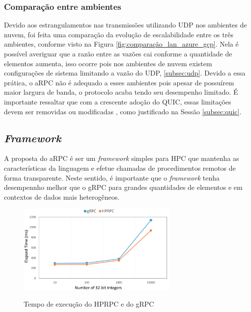 \subsubsection{Comparação entre ambientes}

Devido aos estrangulamentos nas transmissões utilizando UDP nos ambientes de nuvem, foi feita uma comparação da evolução de escalabilidade entre os três ambientes, conforme visto na Figura \ref{fig:comparação_lan_azure_gcp}. Nela é possível averiguar que a razão entre as vazões cai conforme a quantidade de elementos aumenta, isso ocorre pois nos ambientes de nuvem existem configurações de sistema limitando a vazão do UDP, \ref{subsec:udp}. Devido a essa prática, o aRPC não é adequado a esses ambientes pois apesar de possuírem maior largura de banda, o protocolo acaba tendo seu desempenho limitado. É importante ressaltar que com a crescente adoção do QUIC, essas limitações devem ser removidas ou modificadas \cite{rossow2014amplification}, como justificado na Sessão \ref{subsec:quic}.

\subsection{\textit{Framework}}

A proposta do aRPC é ser um \textit{framework} simples para HPC que mantenha as características da linguagem e efetue chamadas de procedimentos remotos de forma transparente. Neste sentido, é importante que o \textit{framework} tenha desempennho melhor que o gRPC para grandes quantidades de elementos e em contextos de dados mais heterogêneos.

\begin{figure}[ht]
    \centering
    \caption{Tempo de execução do HPRPC e do gRPC}
    \includegraphics[width=0.7\textwidth]{figuras/framework/hprpc_time_measure.png}
    \label{fig:hprpc_time_measure}
\end{figure}

